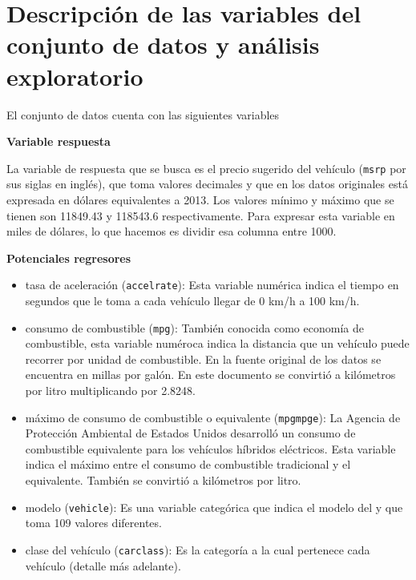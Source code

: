 \documentclass[11pt]{article}
\begin{document}
    \hypertarget{descripciuxf3n-de-las-variables-del-conjunto-de-datos-y-anuxe1lisis-exploratorio}{%
\section{Descripción de las variables del conjunto de datos y análisis
exploratorio}\label{descripciuxf3n-de-las-variables-del-conjunto-de-datos-y-anuxe1lisis-exploratorio}}

    El conjunto de datos cuenta con las siguientes variables

\textbf{Variable respuesta}

La variable de respuesta que se busca es el precio sugerido del vehículo
(\texttt{msrp} por sus siglas en inglés), que toma valores decimales y
que en los datos originales está expresada en dólares equivalentes a
2013. Los valores mínimo y máximo que se tienen son 11849.43 y 118543.6
respectivamente. Para expresar esta variable en miles de dólares, lo que
hacemos es dividir esa columna entre 1000.

\textbf{Potenciales regresores}

\begin{itemize}
\item
  tasa de aceleración (\texttt{accelrate}): Esta variable numérica
  indica el tiempo en segundos que le toma a cada vehículo llegar de 0
  km/h a 100 km/h.
\item
  consumo de combustible (\texttt{mpg}): También conocida como economía
  de combustible, esta variable numéroca indica la distancia que un
  vehículo puede recorrer por unidad de combustible. En la fuente
  original de los datos se encuentra en millas por galón. En este
  documento se convirtió a kilómetros por litro multiplicando por
  2.8248.
\item
  máximo de consumo de combustible o equivalente (\texttt{mpgmpge}): La
  Agencia de Protección Ambiental de Estados Unidos desarrolló un
  consumo de combustible equivalente para los vehículos híbridos
  eléctricos. Esta variable indica el máximo entre el consumo de
  combustible tradicional y el equivalente. También se convirtió a
  kilómetros por litro.
\item
  modelo (\texttt{vehicle}): Es una variable categórica que indica el
  modelo del y que toma 109 valores diferentes.
\item
  clase del vehículo (\texttt{carclass}): Es la categoría a la cual
  pertenece cada vehículo (detalle más adelante).
\end{itemize}
\end{document}
